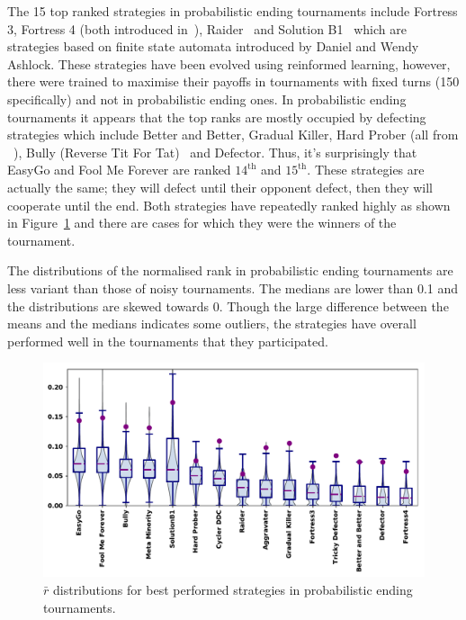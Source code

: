 \documentclass{article}
\begin{document}
The 15 top ranked strategies in probabilistic ending tournaments include
Fortress 3, Fortress 4 (both introduced in~\cite{Ashlock2006}),
Raider~\cite{Ashlock2014} and Solution B1~\cite{Ashlock2014} which are strategies
based on finite state automata introduced by Daniel and Wendy Ashlock. These
strategies have been evolved using reinformed learning, however, there were
trained to maximise their payoffs in tournaments with fixed turns (150
specifically) and not in probabilistic ending ones.
In probabilistic ending tournaments it appears that the top ranks are mostly
occupied by defecting strategies which include Better and Better, Gradual
Killer, Hard Prober (all from ~\cite{prison}), Bully (Reverse Tit For
Tat)~\cite{Nachbar1992} and Defector. Thus, it's surprisingly that EasyGo and
Fool Me Forever are ranked $14^{\text{th}}$ and $15^{\text{th}}$. These
strategies are actually the same; they will defect until their opponent defect,
then they will cooperate until the end. Both strategies have repeatedly ranked highly
as shown in Figure~\ref{fig:probend_results} and there are cases for which they
were the winners of the tournament.

The distributions of the normalised rank in probabilistic ending tournaments are
less variant than those of noisy tournaments. The medians are lower than 0.1 and the
distributions are skewed towards 0. Though the large difference between the means
and the medians indicates some outliers, the strategies have overall performed
well in the tournaments that they participated.

\begin{figure}[h!]
    \centering
    \includegraphics[width=.7\textwidth]{../images/performance_probend.pdf}
    \caption{\(\bar{r}\) distributions for best performed strategies in probabilistic ending tournaments.}
    \label{fig:probend_results}
\end{figure}
\end{document}
